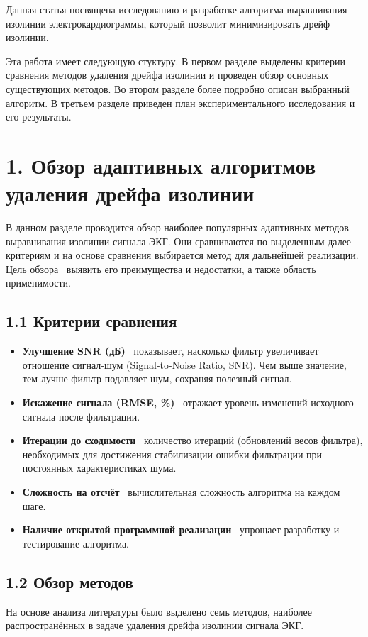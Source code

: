 \documentclass[10pt,a5paper]{article}
\numberwithin{figure}{section}
\numberwithin{table}{section}
\begin{document}
Данная статья посвящена исследованию и разработке алгоритма выравнивания изолинии электрокардиограммы, который позволит минимизировать дрейф изолинии.

Эта работа имеет следующую стуктуру. В первом разделе выделены критерии сравнения методов удаления дрейфа изолинии и проведен обзор основных существующих методов. Во втором разделе более подробно описан выбранный алгоритм. В третьем разделе приведен план экспериментального исследования и его результаты.

\section{1. Обзор адаптивных алгоритмов удаления дрейфа изолинии}
В данном разделе проводится обзор наиболее популярных адаптивных методов выравнивания изолинии сигнала ЭКГ. Они сравниваются по выделенным далее критериям и на основе сравнения выбирается метод для дальнейшей реализации. Цель обзора \textendash\ выявить его преимущества и недостатки, а также область применимости.

\subsection{1.1 Критерии сравнения}
\begin{itemize}
  \item \textbf{Улучшение SNR (дБ)} \textendash\ показывает, насколько фильтр увеличивает отношение сигнал-шум (Signal-to-Noise Ratio, SNR). Чем выше значение, тем лучше фильтр подавляет шум, сохраняя полезный сигнал.
  \item \textbf{Искажение сигнала (RMSE, \%)} \textendash\ отражает уровень изменений исходного сигнала после фильтрации.
  \item \textbf{Итерации до сходимости} \textendash\ количество итераций (обновлений весов фильтра), необходимых для достижения стабилизации ошибки фильтрации при постоянных характеристиках шума.
  \item \textbf{Сложность на отсчёт} \textendash\ вычислительная сложность алгоритма на каждом шаге.
  \item \textbf{Наличие открытой программной реализации} \textendash\ упрощает разработку и тестирование алгоритма.
\end{itemize}

\subsection{1.2 Обзор методов}
На основе анализа литературы было выделено семь методов, наиболее распространённых в задаче удаления дрейфа изолинии сигнала ЭКГ.
\end{document}
